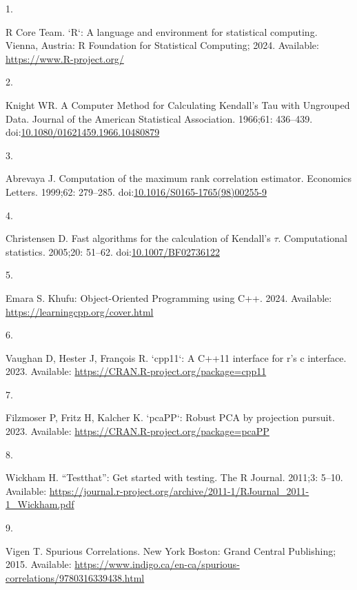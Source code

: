 \documentclass[
  10pt,
  letterpaper,
]{article}
\newlength{\cslhangindent}
\newlength{\csllabelwidth}
\newenvironment{CSLReferences}[2] %
 {\begin{list}{}{%
  \setlength{\itemindent}{0pt}
  \setlength{\leftmargin}{0pt}
  \setlength{\parsep}{0pt}
  \ifodd #1
   \setlength{\leftmargin}{\cslhangindent}
   \setlength{\itemindent}{-1\cslhangindent}
  \fi
  \setlength{\itemsep}{#2\baselineskip}}}
 {\end{list}}
\newcommand{\CSLLeftMargin}[1]{\parbox[t]{\csllabelwidth}{\strut#1\strut}}
\newcommand{\CSLRightInline}[1]{\parbox[t]{\linewidth - \csllabelwidth}{\strut#1\strut}}
\begin{document}
\label{refs}
\begin{CSLReferences}{0}{1}
\CSLLeftMargin{1. }%
\CSLRightInline{R Core Team. `R`: A language and environment for
statistical computing. Vienna, Austria: {R} Foundation for Statistical
Computing; 2024. Available: \url{https://www.R-project.org/}}

\CSLLeftMargin{2. }%
\CSLRightInline{Knight WR. A {Computer} {Method} for {Calculating}
{Kendall}'s {Tau} with {Ungrouped} {Data}. Journal of the American
Statistical Association. 1966;61: 436--439.
doi:\href{https://doi.org/10.1080/01621459.1966.10480879}{10.1080/01621459.1966.10480879}}

\CSLLeftMargin{3. }%
\CSLRightInline{Abrevaya J. Computation of the maximum rank correlation
estimator. Economics Letters. 1999;62: 279--285.
doi:\href{https://doi.org/10.1016/S0165-1765(98)00255-9}{10.1016/S0165-1765(98)00255-9}}

\CSLLeftMargin{4. }%
\CSLRightInline{Christensen D. Fast algorithms for the calculation of
{Kendall}'s \(\tau\). Computational statistics. 2005;20: 51--62.
doi:\href{https://doi.org/10.1007/BF02736122}{10.1007/BF02736122}}

\CSLLeftMargin{5. }%
\CSLRightInline{Emara S. Khufu: {Object}-{Oriented} {Programming} using
{C}++. 2024. Available: \url{https://learningcpp.org/cover.html}}

\CSLLeftMargin{6. }%
\CSLRightInline{Vaughan D, Hester J, François R. `cpp11`: A {C++}11
interface for r's c interface. 2023. Available:
\url{https://CRAN.R-project.org/package=cpp11}}

\CSLLeftMargin{7. }%
\CSLRightInline{Filzmoser P, Fritz H, Kalcher K. `pcaPP`: Robust PCA by
projection pursuit. 2023. Available:
\url{https://CRAN.R-project.org/package=pcaPP}}

\CSLLeftMargin{8. }%
\CSLRightInline{Wickham H. {``Testthat''}: Get started with testing. The
R Journal. 2011;3: 5--10. Available:
\url{https://journal.r-project.org/archive/2011-1/RJournal_2011-1_Wickham.pdf}}

\CSLLeftMargin{9. }%
\CSLRightInline{Vigen T. Spurious {Correlations}. New York Boston: Grand
Central Publishing; 2015. Available:
\url{https://www.indigo.ca/en-ca/spurious-correlations/9780316339438.html}}


\end{CSLReferences}
\end{document}
